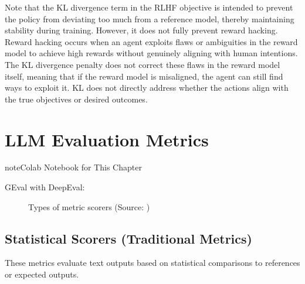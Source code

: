 \documentclass[letterpaper,11pt,english]{sphinxmanual}
\begin{document}
\sphinxAtStartPar
Note that the KL divergence term in the RLHF objective is intended to
prevent the policy from deviating too much from a reference model,
thereby maintaining stability during training. However, it does not
fully prevent reward hacking. Reward hacking occurs when an agent
exploits flaws or ambiguities in the reward model to achieve high
rewards without genuinely aligning with human intentions. The KL
divergence penalty does not correct these flaws in the reward model
itself, meaning that if the reward model is misaligned, the agent can
still find ways to exploit it. KL does not directly address whether the
actions align with the true objectives or desired outcomes.

\sphinxstepscope


\chapter{LLM Evaluation Metrics}
\label{\detokenize{evaluation:llm-evaluation-metrics}}\label{\detokenize{evaluation:evaluation}}\label{\detokenize{evaluation::doc}}
\begin{sphinxadmonition}{note}{Colab Notebook for This Chapter}

\sphinxAtStartPar
GEval with DeepEval: 
\end{sphinxadmonition}

\begin{figure}[htbp]
\centering
\capstart

\noindent{}
\caption{Types of metric scorers (Source: )}\label{\detokenize{evaluation:id3}}\label{\detokenize{evaluation:fig-metrics-llm}}\end{figure}


\section{Statistical Scorers (Traditional Metrics)}
\label{\detokenize{evaluation:statistical-scorers-traditional-metrics}}
\sphinxAtStartPar
These metrics evaluate text outputs based on statistical comparisons to references
or expected outputs.
\end{document}
